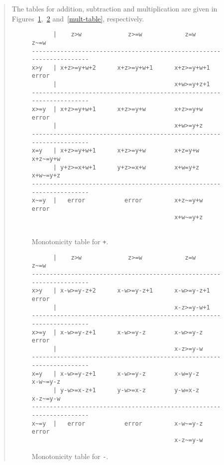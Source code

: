 \begin{quote}
The tables for addition, subtraction and
multiplication are given in Figures~\ref{add-table},~\ref{sub-table}
and~\ref{mult-table}, respectively.

\begin{figure}
\begin{verbatim}
      |    z>w             z>=w            z=w             z~=w
---------------------------------------------------------------------
x>y   | x+z>=y+w+2      x+z>=y+w+1      x+z>=y+w+1         error
      |                                 x+w>=y+z+1
---------------------------------------------------------------------
x>=y  | x+z>=y+w+1      x+z>=y+w        x+z>=y+w           error
      |                                 x+w>=y+z
---------------------------------------------------------------------
x=y   | x+z>=y+w+1      x+z>=y+w        x+z=y+w         x+z~=y+w
      | y+z>=x+w+1      y+z>=x+w        x+w=y+z         x+w~=y+z
---------------------------------------------------------------------
x~=y  |   error           error         x+z~=y+w           error
                                        x+w~=y+z
  
\end{verbatim}
\caption{\protect Monotonicity table for {\tt +}. \label{add-table}}
\end{figure}

\begin{figure}
\begin{verbatim}
      |    z>w             z>=w            z=w            z~=w
---------------------------------------------------------------------
x>y   | x-w>=y-z+2      x-w>=y-z+1      x-w>=y-z+1        error
      |                                 x-z>=y-w+1
---------------------------------------------------------------------
x>=y  | x-w>=y-z+1      x-w>=y-z        x-w>=y-z          error
      |                                 x-z>=y-w
---------------------------------------------------------------------
x=y   | x-w>=y-z+1      x-w>=y-z        x-w=y-z         x-w~=y-z
      | y-w>=x-z+1      y-w>=x-z        y-w=x-z         x-z~=y-w
---------------------------------------------------------------------
x~=y  |   error           error         x-w~=y-z          error
                                        x-z~=y-w
\end{verbatim}
\caption{\protect Monotonicity table for {\tt -}. \label{sub-table}}
\end{figure}


\end{quote}
